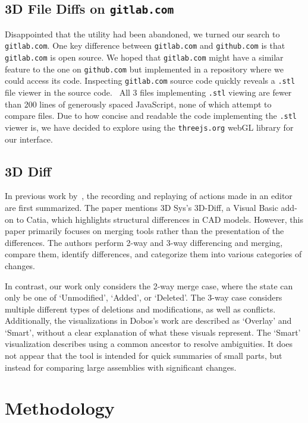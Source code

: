 \documentclass[sigconf,authorversion,nonacm]{acmart}
\begin{document}
\subsection{3D File Diffs on \texttt{gitlab.com}}

Disappointed that the utility had been abandoned, we turned our search to \texttt{gitlab.com}.
One key difference between \texttt{gitlab.com} and \texttt{github.com} is that \texttt{gitlab.com} is open source.
We hoped that \texttt{gitlab.com} might have a similar feature to the one on \texttt{github.com} but implemented in a repository where we could access its code.
Inspecting \texttt{gitlab.com} source code quickly reveals a \texttt{.stl} file viewer in the source code.~\cite{gitlabsource}
All 3 files implementing \texttt{.stl} viewing are fewer than 200 lines of generously spaced JavaScript, none of which attempt to compare files.
Due to how concise and readable the code implementing the \texttt{.stl} viewer is, we have decided to explore using the \texttt{threejs.org} webGL library for our interface.

\subsection{3D Diff}

In previous work by~\citet{Dobos}, the recording and replaying of actions made in an editor are first summarized.
The paper mentions 3D Sys's 3D-Diff, a Visual Basic add-on to Catia, which highlights structural differences in CAD models.
However, this paper primarily focuses on merging tools rather than the presentation of the differences.
The authors perform 2-way and 3-way differencing and merging, compare them, identify differences, and categorize them into various categories of changes.

In contrast, our work only considers the 2-way merge case, where the state can only be one of `Unmodified', `Added', or `Deleted'.
The 3-way case considers multiple different types of deletions and modifications, as well as conflicts.
Additionally, the visualizations in Dobos's work are described as `Overlay' and `Smart', without a clear explanation of what these visuals represent.
The `Smart' visualization describes using a common ancestor to resolve ambiguities. It does not appear that the tool is intended for quick summaries of small parts, but instead for comparing large assemblies with significant changes.

\section{Methodology}
\end{document}
